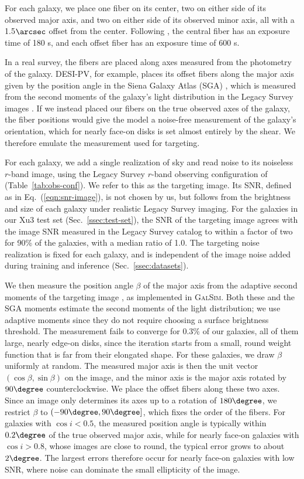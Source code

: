 For each galaxy, we place one fiber on its center, two on either side of its observed major axis, and two on either side of its observed minor axis, all with a 1.5$\arcsec$ offset from the center. Following \citep{KLDESI}, the central fiber has an exposure time of 180 s, and each offset fiber has an exposure time of 600 s.

In a real survey, the fibers are placed along axes measured from the photometry of the galaxy. DESI-PV, for example, places its offset fibers along the major axis given by the position angle in the Siena Galaxy Atlas (SGA) \citep{DESIPVTargetSel2023}, which is measured from the second moments of the galaxy's light distribution in the Legacy Survey images \citep{SGA2020}. If we instead placed our fibers on the true observed axes of the galaxy, the fiber positions would give the model a noise-free measurement of the galaxy's orientation, which for nearly face-on disks is set almost entirely by the shear. We therefore emulate the measurement used for targeting.

For each galaxy, we add a single realization of sky and read noise to its noiseless $r$-band image, using the Legacy Survey $r$-band observing configuration of \citep{KLDESI} (Table~\ref{tab:obs-conf}). We refer to this as the targeting image. Its SNR, defined as in Eq.~(\ref{eqn:snr-image}), is not chosen by us, but follows from the brightness and size of each galaxy under realistic Legacy Survey imaging. For the galaxies in our Xu3 test set (Sec.~\ref{ssec:test-set}), the SNR of the targeting image agrees with the image SNR measured in the Legacy Survey catalog to within a factor of two for 90\% of the galaxies, with a median ratio of 1.0. The targeting noise realization is fixed for each galaxy, and is independent of the image noise added during training and inference (Sec.~\ref{ssec:datasets}).

We then measure the position angle $\beta$ of the major axis from the adaptive second moments of the targeting image \citep{Hirata2003, Mandelbaum2005}, as implemented in \textsc{GalSim}. Both these and the SGA moments estimate the second moments of the light distribution; we use adaptive moments since they do not require choosing a surface brightness threshold. The measurement fails to converge for 0.3\% of our galaxies, all of them large, nearly edge-on disks, since the iteration starts from a small, round weight function that is far from their elongated shape. For these galaxies, we draw $\beta$ uniformly at random. The measured major axis is then the unit vector $(\cos\beta, \sin\beta)$ on the image, and the minor axis is the major axis rotated by $90\degree$ counterclockwise. We place the offset fibers along these two axes. Since an image only determines its axes up to a rotation of $180\degree$, we restrict $\beta$ to $(-90\degree, 90\degree]$, which fixes the order of the fibers. For galaxies with $\cos i < 0.5$, the measured position angle is typically within $0.2\degree$ of the true observed major axis, while for nearly face-on galaxies with $\cos i > 0.8$, whose images are close to round, the typical error grows to about $2\degree$. The largest errors therefore occur for nearly face-on galaxies with low SNR, where noise can dominate the small ellipticity of the image.

